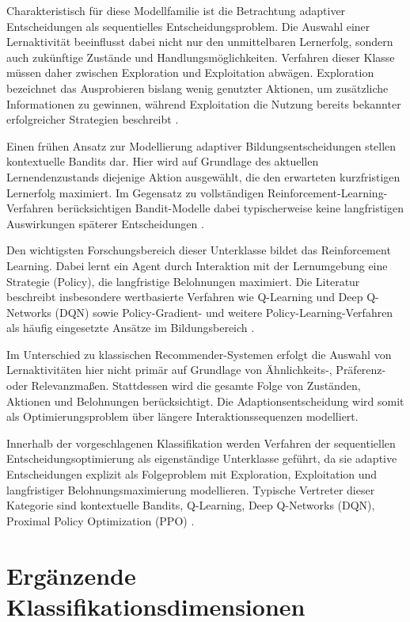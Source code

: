 Charakteristisch für diese Modellfamilie ist die Betrachtung adaptiver
Entscheidungen als sequentielles Entscheidungsproblem. Die Auswahl einer
Lernaktivität beeinflusst dabei nicht nur den unmittelbaren Lernerfolg,
sondern auch zukünftige Zustände und Handlungsmöglichkeiten. Verfahren
dieser Klasse müssen daher zwischen Exploration und Exploitation
abwägen. Exploration bezeichnet das Ausprobieren bislang wenig genutzter
Aktionen, um zusätzliche Informationen zu gewinnen, während Exploitation
die Nutzung bereits bekannter erfolgreicher Strategien beschreibt
\citep{Riedmann2025}.

Einen frühen Ansatz zur Modellierung adaptiver Bildungsentscheidungen
stellen kontextuelle Bandits dar. Hier wird auf Grundlage des aktuellen
Lernendenzustands diejenige Aktion ausgewählt, die den erwarteten
kurzfristigen Lernerfolg maximiert. Im Gegensatz zu vollständigen
Reinforcement-Learning-Verfahren berücksichtigen Bandit-Modelle dabei
typischerweise keine langfristigen Auswirkungen späterer Entscheidungen
\citep{Riedmann2025}.

Den wichtigsten Forschungsbereich dieser Unterklasse bildet das
Reinforcement Learning. Dabei lernt ein Agent durch Interaktion mit der
Lernumgebung eine Strategie (Policy), die langfristige Belohnungen
maximiert. Die Literatur beschreibt insbesondere wertbasierte Verfahren
wie Q-Learning und Deep Q-Networks (DQN) sowie Policy-Gradient- und
weitere Policy-Learning-Verfahren als häufig eingesetzte Ansätze im
Bildungsbereich \citep{Riedmann2025}.

Im Unterschied zu klassischen Recommender-Systemen erfolgt die Auswahl
von Lernaktivitäten hier nicht primär auf Grundlage von Ähnlichkeits-,
Präferenz- oder Relevanzmaßen. Stattdessen wird die gesamte Folge von
Zuständen, Aktionen und Belohnungen berücksichtigt. Die
Adaptionsentscheidung wird somit als Optimierungsproblem über längere
Interaktionssequenzen modelliert.

Innerhalb der vorgeschlagenen Klassifikation werden Verfahren der
sequentiellen Entscheidungsoptimierung als eigenständige Unterklasse
geführt, da sie adaptive Entscheidungen explizit als Folgeproblem mit
Exploration, Exploitation und langfristiger Belohnungsmaximierung
modellieren. Typische Vertreter dieser Kategorie sind kontextuelle
Bandits, Q-Learning, Deep Q-Networks (DQN), Proximal Policy Optimization
(PPO) \citep{Riedmann2025}.

\section{Ergänzende
Klassifikationsdimensionen}\label{erguxe4nzende-klassifikationsdimensionen}

